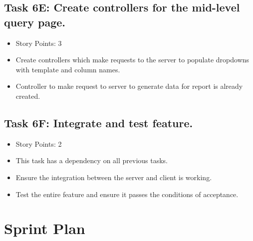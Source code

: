 \documentclass[12pt]{article}
\begin{document}
\subsection{Task 6E: Create controllers for the mid-level query page.}
\begin{itemize}%
\item Story Points: 3
\item Create controllers which make requests to the server to populate dropdowns with template and column names.
\item Controller to make request to server to generate data for report is already created. 
\end{itemize}

\subsection{Task 6F: Integrate and test feature.}
\begin{itemize}%
\item Story Points: 2
\item This task has a dependency on all previous tasks.
\item Ensure the integration between the server and client is working.
\item Test the entire feature and ensure it passes the conditions of acceptance.
\end{itemize}

\newpage
\section{Sprint Plan}
\end{document}
